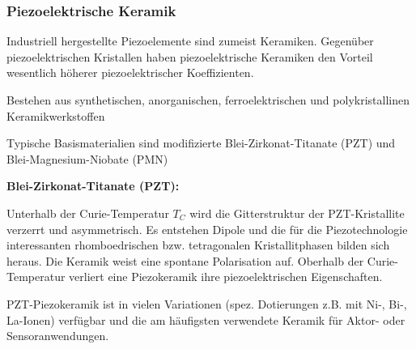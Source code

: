 \subsubsection{Piezoelektrische Keramik}
Industriell hergestellte Piezoelemente sind zumeist Keramiken. Gegenüber piezoelektrischen Kristallen haben piezoelektrische Keramiken den Vorteil wesentlich höherer piezoelektrischer Koeffizienten. 
\begin{compactitem}
    \item  Bestehen aus synthetischen, anorganischen, ferroelektrischen und polykristallinen Keramikwerkstoffen
    \item Typische Basismaterialien sind modifizierte Blei-Zirkonat-Titanate (PZT) und Blei-Magnesium-Niobate (PMN)
\end{compactitem}
\textbf{Blei-Zirkonat-Titanate (PZT):}
\begin{compactitem}
    \item Unterhalb der Curie-Temperatur $T_{C}$ wird die Gitterstruktur der PZT-Kristallite verzerrt und asymmetrisch. Es entstehen Dipole und die für die Piezotechnologie interessanten rhomboedrischen bzw. tetragonalen Kristallitphasen bilden sich heraus. Die Keramik weist eine spontane Polarisation auf. Oberhalb der Curie-Temperatur verliert eine Piezokeramik ihre piezoelektrischen Eigenschaften.
    \item PZT-Piezokeramik ist in vielen Variationen (spez. Dotierungen z.B. mit Ni-, Bi-, La-Ionen) verfügbar und die am häufigsten verwendete Keramik für Aktor- oder Sensoranwendungen. 
\end{compactitem}


